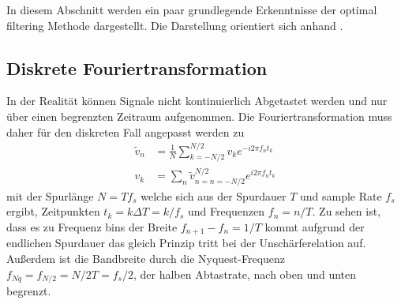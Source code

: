 In diesem Abschnitt werden ein paar grundlegende Erkenntnisse der optimal filtering Methode dargestellt.
Die Darstellung orientiert sich anhand \cite{Golwala2000, Enss2005}.

\subsection{Diskrete Fouriertransformation}
In der Realität können Signale nicht kontinuierlich Abgetastet werden und nur über einen begrenzten Zeitraum aufgenommen.
Die Fouriertransformation muss daher für den diskreten Fall angepasst werden zu
\begin{align*}
\widetilde{v}_n &= \frac{1}{N}\sum_{k=-N/2}^{N/2} v_k e^{-i2\pi f_n t_k} \\
v_k &= \sum_n \widetilde{v}_{n=n=-N/2}^{N/2} e^{i2\pi f_n t_k}
\end{align*}
mit der Spurlänge $N=Tf_s$ welche sich aus der Spurdauer $T$ und sample Rate $f_s$ ergibt, Zeitpunkten $t_k = k\Delta T = k/f_s$ und Frequenzen $f_n = n/T$.
Zu sehen ist, dass es zu Frequenz bins der Breite $f_{n+1}-f_n=1/T$ kommt aufgrund der endlichen Spurdauer das gleich Prinzip tritt bei der Unschärferelation auf.
Außerdem ist die Bandbreite durch die Nyquest-Frequenz $f_{Nq}=f_{N/2}=N/2T=f_s/2$, der halben Abtastrate, nach oben und unten begrenzt.

